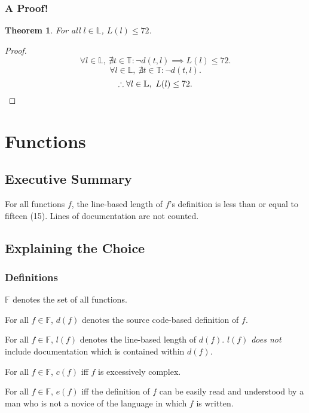 \documentclass{report}
\newtheorem{thm}{Theorem}
\begin{document}
\subsubsection{A Proof!}
\begin{thm}
	For all $l \in \mathbb L$, $L(l) \leq 72$.
\end{thm}
\begin{proof}
	\[
		\forall l \in \mathbb L,\ 
		\nexists t \in \mathbb T : \neg d(t, l) \implies L(l) \leq 72.
	\]
	\[
		\forall l \in \mathbb L,\ 
		\nexists t \in \mathbb T : \neg d(t, l).
	\]
	\[
		\therefore
		\forall l \in \mathbb L,\ 
		L(l) \leq 72.
		\qedhere
	\]
\end{proof}
\section{Functions}
\subsection{Executive Summary}
For all functions $f$, the line-based length of $f$'s definition is less than or equal to fifteen (15).  Lines of documentation are not counted.
\subsection{Explaining the Choice}
\subsubsection{Definitions}
$\mathbb F$ denotes the set of all functions.

For all $f \in \mathbb F$, $d(f)$ denotes the source code-based definition of $f$.

For all $f \in \mathbb F$, $l(f)$ denotes the line-based length of $d(f)$.  $l(f)$ \textit{does not} include documentation which is contained within $d(f)$.

For all $f \in \mathbb F$, $c(f)$ iff $f$ is excessively complex.

For all $f \in \mathbb F$, $e(f)$ iff the definition of $f$ can be easily read and understood by a man who is not a novice of the language in which $f$ is written.
\end{document}
